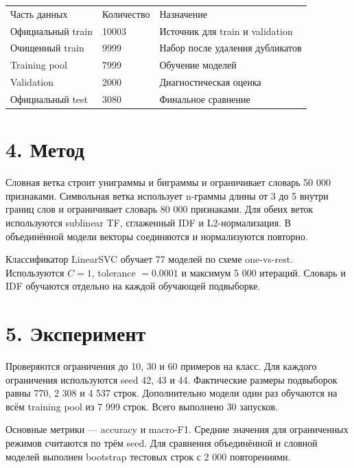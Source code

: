 \documentclass{article}
\begin{document}
\begin{longtable}{p{4.5cm}p{3cm}p{6cm}}
Часть данных & Количество & Назначение \\
Официальный train & 10003 & Источник для train и validation \\
Очищенный train & 9999 & Набор после удаления дубликатов \\
Training pool & 7999 & Обучение моделей \\
Validation & 2000 & Диагностическая оценка \\
Официальный test & 3080 & Финальное сравнение \\
\end{longtable}

\section*{4. Метод}
Словная ветка строит униграммы и биграммы и ограничивает словарь 50 000 признаками. Символьная ветка использует n-граммы длины от 3 до 5 внутри границ слов и ограничивает словарь 80 000 признаками. Для обеих веток используются sublinear TF, сглаженный IDF и L2-нормализация. В объединённой модели векторы соединяются и нормализуются повторно.

Классификатор LinearSVC обучает 77 моделей по схеме one-vs-rest. Используются $C=1$, tolerance $=0.0001$ и максимум 5 000 итераций. Словарь и IDF обучаются отдельно на каждой обучающей подвыборке.

\section*{5. Эксперимент}
Проверяются ограничения до 10, 30 и 60 примеров на класс. Для каждого ограничения используются seed 42, 43 и 44. Фактические размеры подвыборок равны 770, 2 308 и 4 537 строк. Дополнительно модели один раз обучаются на всём training pool из 7 999 строк. Всего выполнено 30 запусков.

Основные метрики --- accuracy и macro-F1. Средние значения для ограниченных режимов считаются по трём seed. Для сравнения объединённой и словной моделей выполнен bootstrap тестовых строк с 2 000 повторениями.
\end{document}
